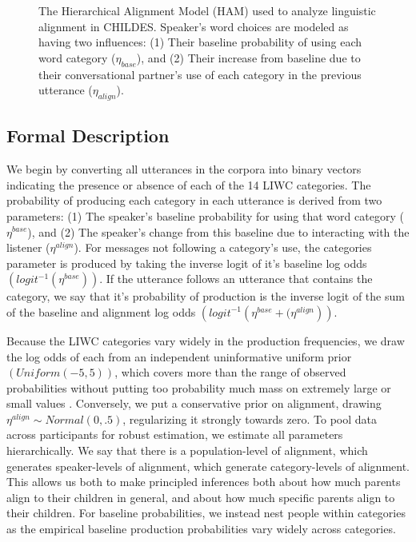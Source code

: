 \documentclass[10pt,letterpaper]{article}
\begin{document}
\begin{figure}[tb]
  \begin{center}
    
  \end{center}
  \caption{The Hierarchical Alignment Model (HAM) used to analyze linguistic alignment in CHILDES. Speaker's word choices are modeled as having two influences: (1) Their baseline probability of using each word category ($\eta_{base}$), and (2) Their increase from baseline due to their conversational partner's use of each category in the previous utterance ($\eta_{align}$).}
  \label{fig:model}
\end{figure}

\subsection{Formal Description}

We begin by converting all utterances in the corpora into binary vectors indicating the presence or absence of each of the 14 LIWC categories. The probability of producing each category in each utterance is derived from two parameters: (1) The speaker's baseline probability for using that word category ($\eta^{base}$), and (2) The speaker's change from this baseline due to interacting with the listener ($\eta^{align}$). For messages not following a category's use, the categories parameter is produced by taking the inverse logit of it's baseline log odds $\left(logit^{-1}\left(\eta^{base}\right)\right)$. If the utterance follows an utterance that contains the category, we say that it's probability of production is the inverse logit of the sum of the baseline and alignment log odds $\left(logit^{-1}\left(\eta^{base} + (\eta^{align}\right)\right)$.

Because the LIWC categories vary widely in the production frequencies, we draw the log odds of each from an independent uninformative uniform prior $\left(Uniform\left(-5,5\right)\right)$, which covers more than the range of observed probabilities without putting too probability much mass on extremely large or small values \cite{gelman2008}. Conversely, we put a conservative prior on alignment, drawing $\eta^{align} \sim Normal(0,.5)$, regularizing it strongly towards zero. To pool data across participants for robust estimation, we estimate all parameters hierarchically. We say that there is a population-level of alignment, which generates speaker-levels of alignment, which generate category-levels of alignment. This allows us both to make principled inferences both about how much parents align to their children in general, and about how much specific parents align to their children. For baseline probabilities, we instead nest people within categories as the empirical baseline production probabilities vary widely across categories.
\end{document}
